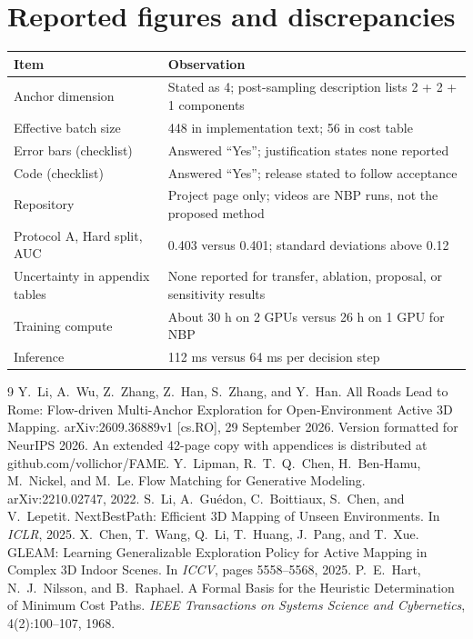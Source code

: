 \documentclass[11pt]{article}
\theoremstyle{plain}
\theoremstyle{remark}
\begin{document}
\section{Reported figures and discrepancies}

\begin{center}
\small
\begin{tabular}{p{}p{}}
\toprule
Item & Observation\\
\midrule
Anchor dimension & Stated as 4; post-sampling description lists 2 + 2 + 1 components\\
Effective batch size & 448 in implementation text; 56 in cost table\\
Error bars (checklist) & Answered ``Yes''; justification states none reported\\
Code (checklist) & Answered ``Yes''; release stated to follow acceptance\\
Repository & Project page only; videos are NBP runs, not the proposed method\\
Protocol A, Hard split, AUC & 0.403 versus 0.401; standard deviations above 0.12\\
Uncertainty in appendix tables & None reported for transfer, ablation, proposal, or sensitivity results\\
Training compute & About 30 h on 2 GPUs versus 26 h on 1 GPU for NBP\\
Inference & 112 ms versus 64 ms per decision step\\
\bottomrule
\end{tabular}
\end{center}

\begin{thebibliography}{9}
 Y.~Li, A.~Wu, Z.~Zhang, Z.~Han, S.~Zhang, and Y.~Han. All Roads Lead to Rome: Flow-driven Multi-Anchor Exploration for Open-Environment Active 3D Mapping. arXiv:2609.36889v1 [cs.RO], 29 September 2026. Version formatted for NeurIPS 2026. An extended 42-page copy with appendices is distributed at github.com/vollichor/FAME.
 Y.~Lipman, R.~T.~Q.~Chen, H.~Ben-Hamu, M.~Nickel, and M.~Le. Flow Matching for Generative Modeling. arXiv:2210.02747, 2022.
 S.~Li, A.~Gu\'edon, C.~Boittiaux, S.~Chen, and V.~Lepetit. NextBestPath: Efficient 3D Mapping of Unseen Environments. In \emph{ICLR}, 2025.
 X.~Chen, T.~Wang, Q.~Li, T.~Huang, J.~Pang, and T.~Xue. GLEAM: Learning Generalizable Exploration Policy for Active Mapping in Complex 3D Indoor Scenes. In \emph{ICCV}, pages 5558--5568, 2025.
 P.~E.~Hart, N.~J.~Nilsson, and B.~Raphael. A Formal Basis for the Heuristic Determination of Minimum Cost Paths. \emph{IEEE Transactions on Systems Science and Cybernetics}, 4(2):100--107, 1968.
\end{thebibliography}
\end{document}
